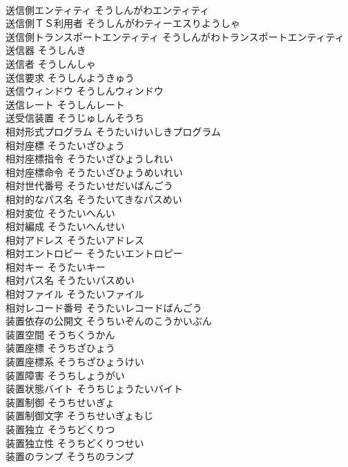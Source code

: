 \documentclass[8pt]{extreport}
\begin{document}
\begin{CJK}{UTF8}{min}
\\	送信側エンティティ	そうしんがわエンティティ	
\\	送信側ＴＳ利用者	そうしんがわティーエスりようしゃ	
\\	送信側トランスポートエンティティ	そうしんがわトランスポートエンティティ	
\\	送信器	そうしんき	
\\	送信者	そうしんしゃ	
\\	送信要求	そうしんようきゅう	
\\	送信ウィンドウ	そうしんウィンドウ	
\\	送信レート	そうしんレート	
\\	送受信装置	そうじゅしんそうち	
\\	相対形式プログラム	そうたいけいしきプログラム	
\\	相対座標	そうたいざひょう	
\\	相対座標指令	そうたいざひょうしれい	
\\	相対座標命令	そうたいざひょうめいれい	
\\	相対世代番号	そうたいせだいばんごう	
\\	相対的なパス名	そうたいてきなパスめい	
\\	相対変位	そうたいへんい	
\\	相対編成	そうたいへんせい	
\\	相対アドレス	そうたいアドレス	
\\	相対エントロピー	そうたいエントロピー	
\\	相対キー	そうたいキー	
\\	相対パス名	そうたいパスめい	
\\	相対ファイル	そうたいファイル	
\\	相対レコード番号	そうたいレコードばんごう	
\\	装置依存の公開文	そうちいぞんのこうかいぶん	
\\	装置空間	そうちくうかん	
\\	装置座標	そうちざひょう	
\\	装置座標系	そうちざひょうけい	
\\	装置障害	そうちしょうがい	
\\	装置状態バイト	そうちじょうたいバイト	
\\	装置制御	そうちせいぎょ	
\\	装置制御文字	そうちせいぎょもじ	
\\	装置独立	そうちどくりつ	
\\	装置独立性	そうちどくりつせい	
\\	装置のランプ	そうちのランプ	

\end{CJK}
\end{document}
